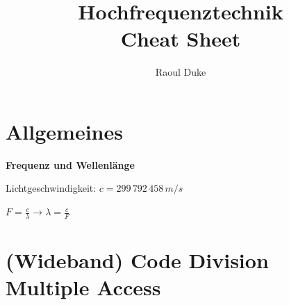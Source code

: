\documentclass[german]{latex4ei/latex4ei_sheet}
\title{Hochfrequenztechnik \\ Cheat Sheet}
\author{Raoul Duke}
\begin{document}
\maketitle
\section{Allgemeines}
    \begin{sectionbox}{\textbf{Frequenz und Wellenlänge}}
        \item Lichtgeschwindigkeit: $c = 299\,792\,458\,m/s$
        \item $F = \frac{c}{\lambda} \rightarrow \lambda = \frac{c}{F}$
    \end{sectionbox}

\section{(Wideband) Code Division Multiple Access}
\end{document}
